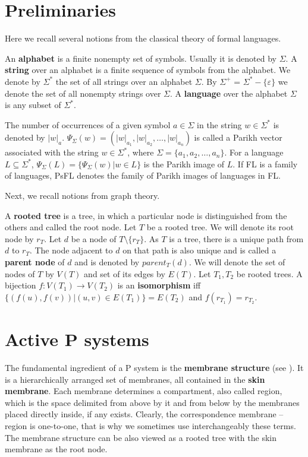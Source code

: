 \documentclass[llncs,submission,copyright,creativecommons]{../lib/lncs/llncs}
\def\eps{\varepsilon}
\begin{document}
\section{Preliminaries}
\label{sec:preliminaries}

Here we recall several notions from the classical theory of formal languages.

An {\bf alphabet} is a finite nonempty set of symbols. Usually it is denoted by $\Sigma$. A {\bf string} over an alphabet is a finite sequence of symbols from the alphabet. We denote by $\Sigma^*$ the set of all strings over an alphabet $\Sigma$. By $\Sigma^+$ = $\Sigma^* - \{\eps\}$ we denote the set of all nonempty strings over $\Sigma$. A {\bf language} over the alphabet $\Sigma$ is any subset of $\Sigma^*$.

The number of occurrences of a given symbol $a\in \Sigma$ in the string $w\in \Sigma^*$ is denoted by $|w|_a$. $\Psi_\Sigma(w)=(|w|_{a_1},|w|_{a_2},\dots,|w|_{a_n})$ is called a Parikh vector associated with the string $w\in \Sigma^*$, where $\Sigma=\{a_1,a_2,\dots, a_n\}$. For a language $L\subseteq \Sigma^*$, $\Psi_\Sigma(L)=\{\Psi_\Sigma(w)|w\in L\}$ is the Parikh image of $L$. If FL is a family of languages, PsFL denotes the family of Parikh images of languages in FL.

Next, we recall notions from graph theory.

A {\bf rooted tree} is a tree, in which a particular node is distinguished from the others and called the root node.
Let $T$ be a rooted tree. We will denote its root node by $r_T$.
Let $d$ be a node of $T\setminus\{r_T\}$.
As $T$ is a tree, there is a unique path from $d$ to $r_T$. 
The node adjacent to $d$ on that path is also unique and is called a {\bf parent node} of $d$ and is denoted by $parent_T(d)$.
We will denote the set of nodes of $T$ by $V(T)$ and set of its edges by $E(T)$.
Let $T_1, T_2$ be rooted trees. A bijection $f: V(T_1)\rightarrow V(T_2)$ is an {\bf isomorphism} iff $\{(f(u),f(v))|(u,v)\in E(T_1)\} = E(T_2)$ and $f(r_{T_1}) = r_{T_2}$. 

  
\section{Active P systems}
\label{sec:p systems}


The fundamental ingredient of a P system is the {\bf membrane structure} (see \cite{Paun2006Introduction}). It is a hierarchically arranged set of membranes, all contained in the {\bf skin membrane}. Each membrane determines a compartment, also called region, which is the space delimited from above by it and from below by the membranes placed directly inside, if any exists. Clearly, the correspondence membrane – region is one-to-one, that is why we sometimes use interchangeably these terms.
The membrane structure can be also viewed as a rooted tree with the skin membrane as the root node.
\end{document}
